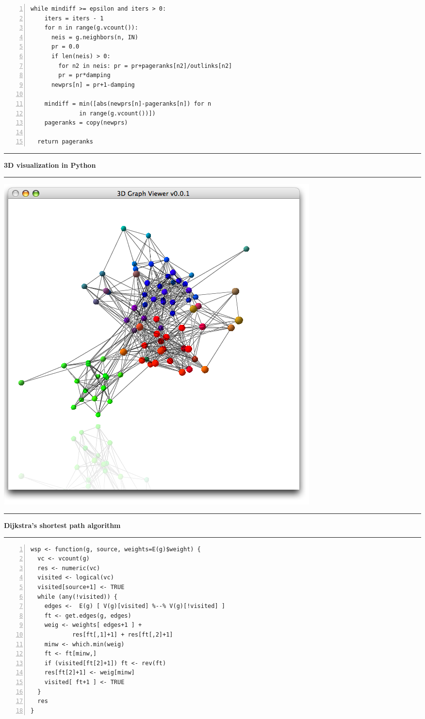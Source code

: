 \documentclass[a0]{sciposter}
\begin{document}
\begin{multicols}{3}
\begin{Verbatim}[fontsize=\small,numbers=left]
  while mindiff >= epsilon and iters > 0:
    iters = iters - 1
    for n in range(g.vcount()):
      neis = g.neighbors(n, IN)
      pr = 0.0
      if len(neis) > 0:
        for n2 in neis: pr = pr+pageranks[n2]/outlinks[n2]
        pr = pr*damping
      newprs[n] = pr+1-damping
 
    mindiff = min([abs(newprs[n]-pageranks[n]) for n 
              in range(g.vcount())])
    pageranks = copy(newprs)
	
  return pageranks
\end{Verbatim}

\vspace{20pt}\hrule\vspace{20pt}
\centerline{\bf 3D visualization in Python}
\vspace{20pt}\hrule\vspace{20pt}

\begin{center}
\includegraphics[width=0.7\columnwidth]{python3d-2}
\end{center}

\vspace{20pt}\hrule\vspace{20pt}
\centerline{\bf Dijkstra's shortest path algorithm}
\vspace{20pt}\hrule\vspace{20pt}

\begin{Verbatim}[fontsize=\small,numbers=left]
wsp <- function(g, source, weights=E(g)$weight) {
  vc <- vcount(g)
  res <- numeric(vc)
  visited <- logical(vc)
  visited[source+1] <- TRUE
  while (any(!visited)) {
    edges <-  E(g) [ V(g)[visited] %--% V(g)[!visited] ]
    ft <- get.edges(g, edges)
    weig <- weights[ edges+1 ] +
            res[ft[,1]+1] + res[ft[,2]+1]
    minw <- which.min(weig)
    ft <- ft[minw,]
    if (visited[ft[2]+1]) ft <- rev(ft)
    res[ft[2]+1] <- weig[minw]
    visited[ ft+1 ] <- TRUE
  }
  res
}
\end{Verbatim}


\end{multicols}
\end{document}
